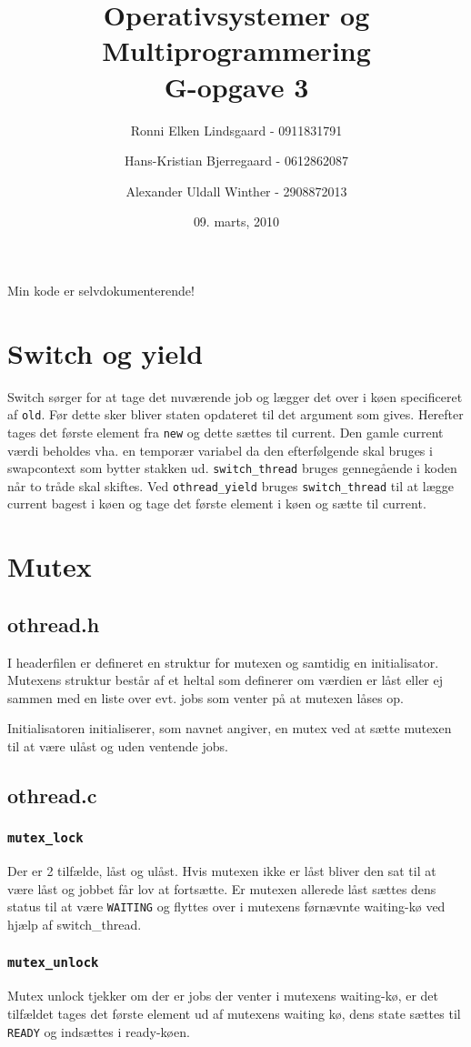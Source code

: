 \documentclass[titlepage]{article}
\title{Operativsystemer og Multiprogrammering\\G-opgave 3}
\author{Ronni Elken Lindsgaard - 0911831791 \and
Hans-Kristian Bjerregaard - 0612862087 \and
Alexander Uldall Winther - 2908872013}
\date{09. marts, 2010}
\begin{document}
\maketitle
\newpage
Min kode er selvdokumenterende!
\section{Switch og yield}
Switch sørger for at tage det nuværende job og lægger det over i køen specificeret af {\tt old}. Før
dette sker bliver staten opdateret til det argument som gives. Herefter tages det første element fra 
{\tt new} og dette sættes til current. Den gamle current værdi beholdes vha. en temporær variabel da
den efterfølgende skal bruges i swapcontext som bytter stakken ud.
{\tt switch\_thread} bruges gennegående i koden når to tråde skal skiftes. Ved {\tt othread\_yield}
bruges {\tt switch\_thread} til at lægge current bagest i køen og tage det første element i køen og
sætte til current. 
\section{Mutex}
\subsection{othread.h}
I headerfilen er defineret en struktur for mutexen og samtidig en initialisator. Mutexens struktur
består af et heltal som definerer om værdien er låst eller ej sammen med en liste over evt. jobs som
venter på at mutexen låses op.

Initialisatoren initialiserer, som navnet angiver, en mutex ved at sætte mutexen til at være ulåst
og uden ventende jobs.
\subsection{othread.c}
\subsubsection{\tt mutex\_lock}
Der er 2 tilfælde, låst og ulåst. Hvis mutexen ikke er låst bliver den sat til at være låst og
jobbet får lov at fortsætte.
Er mutexen allerede låst sættes dens status til at være {\tt WAITING} og flyttes over i mutexens
førnævnte waiting-kø ved hjælp af switch\_thread.
\subsubsection{\tt mutex\_unlock}
Mutex unlock tjekker om der er jobs der venter i mutexens waiting-kø, er det tilfældet tages det
første element ud af mutexens waiting kø, dens state sættes til {\tt READY} og indsættes i
ready-køen.
\end{document}
